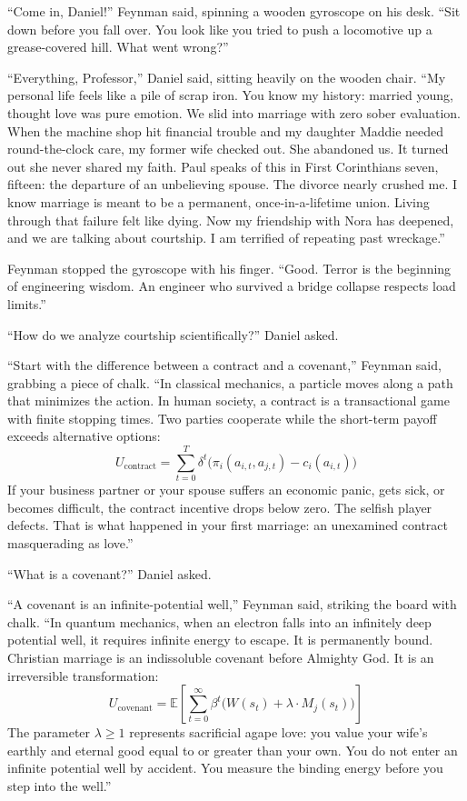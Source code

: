 \documentclass[11pt]{report}
\begin{document}
``Come in, Daniel!'' Feynman said, spinning a wooden gyroscope on his desk. ``Sit down before you fall over. You look like you tried to push a locomotive up a grease-covered hill. What went wrong?''

``Everything, Professor,'' Daniel said, sitting heavily on the wooden chair. ``My personal life feels like a pile of scrap iron. You know my history: married young, thought love was pure emotion. We slid into marriage with zero sober evaluation. When the machine shop hit financial trouble and my daughter Maddie needed round-the-clock care, my former wife checked out. She abandoned us. It turned out she never shared my faith. Paul speaks of this in First Corinthians seven, fifteen: the departure of an unbelieving spouse. The divorce nearly crushed me. I know marriage is meant to be a permanent, once-in-a-lifetime union. Living through that failure felt like dying. Now my friendship with Nora has deepened, and we are talking about courtship. I am terrified of repeating past wreckage.''

Feynman stopped the gyroscope with his finger. ``Good. Terror is the beginning of engineering wisdom. An engineer who survived a bridge collapse respects load limits.''

``How do we analyze courtship scientifically?'' Daniel asked.

``Start with the difference between a contract and a covenant,'' Feynman said, grabbing a piece of chalk. ``In classical mechanics, a particle moves along a path that minimizes the action. In human society, a contract is a transactional game with finite stopping times. Two parties cooperate while the short-term payoff exceeds alternative options:
\begin{equation}
U_{\text{contract}} = \sum_{t=0}^{T} \delta^t \Big( \pi_i(a_{i,t}, a_{j,t}) - c_i(a_{i,t}) \Big)
\end{equation}
If your business partner or your spouse suffers an economic panic, gets sick, or becomes difficult, the contract incentive drops below zero. The selfish player defects. That is what happened in your first marriage: an unexamined contract masquerading as love.''

``What is a covenant?'' Daniel asked.

``A covenant is an infinite-potential well,'' Feynman said, striking the board with chalk. ``In quantum mechanics, when an electron falls into an infinitely deep potential well, it requires infinite energy to escape. It is permanently bound. Christian marriage is an indissoluble covenant before Almighty God. It is an irreversible transformation:
\begin{equation}
U_{\text{covenant}} = \mathbb{E} \left[ \sum_{t=0}^{\infty} \beta^t \Big( W(s_t) + \lambda \cdot M_j(s_t) \Big) \right]
\end{equation}
The parameter $\lambda \ge 1$ represents sacrificial agape love: you value your wife's earthly and eternal good equal to or greater than your own. You do not enter an infinite potential well by accident. You measure the binding energy before you step into the well.''
\end{document}
